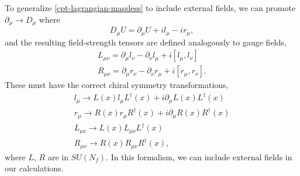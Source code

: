 \documentclass[aps,prd,onecolumn,showpacs,amsmath,amssymb,nofootinbib]{revtex4} \pdfoutput=1
\begin{document}
To generalize \eqref{cpt-lagrangian-massless} to include external fields, we can promote $\partial_\mu \rightarrow D_\mu$ where
\begin{equation}
    \label{covariantDerivativedefn}
    D_\mu U = \partial_\mu U + i l_\mu - i r_\mu,
\end{equation}
and the resulting field-strength tensors are defined analogously to gauge fields,
\begin{gather}
    \label{fieldstrengthTensor1}
    L_{\mu\nu} = \partial_\mu l_\nu - \partial_\nu l_\mu + i \left[l_\mu,l_\nu\right]\\
    \label{fieldstrengthTensor2}
    R_{\mu\nu} = \partial_\mu r_\nu - \partial_\nu r_\mu + i \left[r_\mu,r_\nu\right].
\end{gather}
These must have the correct chiral symmetry transformations,
\begin{gather}
    \label{fieldTransformations}
    l_\mu \rightarrow L(x) l_\mu L^\dagger(x) + i\partial_\mu L(x)L^\dagger(x)\\ 
    r_\mu \rightarrow R(x) r_\mu R^\dagger(x) + i\partial_\mu R(x)R^\dagger(x)\\
    L_{\mu\nu} \rightarrow L(x) L_{\mu\nu} L^\dagger(x)\\
    R_{\mu\nu} \rightarrow R(x) R_{\mu\nu} R^\dagger(x),
\end{gather}
where $L,\,R$ are in $S\!U(N_f)$. In this formalism, we can include external fields in our calculations.
\end{document}

